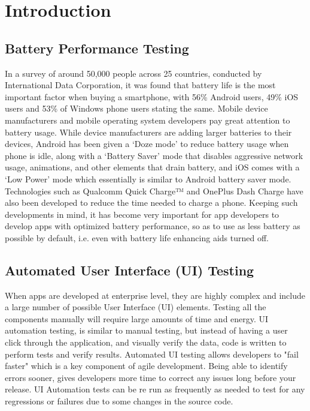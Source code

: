 
\chapter{Introduction}


\section{Battery Performance Testing}
In a survey of around 50,000 people across 25 countries, conducted by International Data Corporation, it was found that battery life is the most important factor when buying a smartphone, with 56\% Android users, 49\% iOS users and 53\% of Windows phone users stating the same.\cite{idcsurvey} Mobile device manufacturers and mobile operating system developers pay great attention to battery usage. While device manufacturers are adding larger batteries to their devices, Android has been given a ‘Doze mode’ to reduce battery usage when phone is idle, along with a ‘Battery Saver’ mode that disables aggressive network usage, animations, and other elements that drain battery, and iOS comes with a ‘Low Power’ mode which essentially is similar to Android battery saver mode. Technologies such as Qualcomm Quick Charge™ and OnePlus Dash Charge have also been developed to reduce the time needed to charge a phone. Keeping such developments in mind, it has become very important for app developers to develop apps with optimized battery performance, so as to use as less battery as possible by default, i.e. even with battery life enhancing aids turned off.

\section{Automated User Interface (UI) Testing}
When apps are developed at enterprise level, they are highly complex and include a large number of possible User Interface (UI) elements. Testing all the components manually will require large amounts of time and energy. UI automation testing, is similar to manual testing, but instead of having a user click through the application, and visually verify the data, code is written to perform tests and verify results. Automated UI testing allows developers to "fail faster" which is a key component of agile development. Being able to identify errors sooner, gives developers more time to correct any issues long before your release. UI Automation tests can be re run as frequently as needed to test for any regressions or failures due to some changes in the source code.

